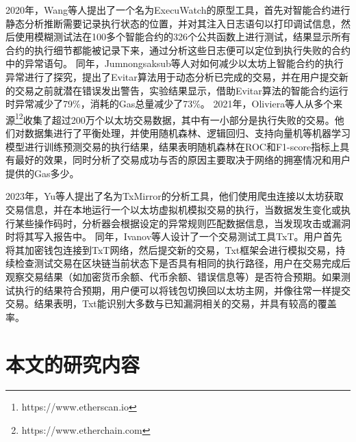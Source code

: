 2020年，Wang等人提出了一个名为ExecuWatch\cite{wang2020onthe}的原型工具，首先对智能合约进行静态分析推断需要记录执行状态的位置，并对其注入日志语句以打印调试信息，然后使用模糊测试法在100多个智能合约的326个公共函数上进行测试，结果显示所有合约的执行细节都能被记录下来，通过分析这些日志便可以定位到执行失败的合约中的异常语句。
同年，Jumnongsaksub等人对如何减少以太坊上智能合约的执行异常进行了探究，提出了Evitar算法用于动态分析已完成的交易，并在用户提交新的交易之前就潜在错误发出警告，实验结果显示，借助Evitar算法的智能合约运行时异常减少了79\%，消耗的Gas总量减少了73\%。
2021年，Oliviera等人从多个来源\footnote{https://www.etherscan.io}\footnote{https://www.etherchain.com}收集了超过200万个以太坊交易数据，其中有一小部分是执行失败的交易。他们对数据集进行了平衡处理，并使用随机森林、逻辑回归、支持向量机等机器学习模型进行训练预测交易的执行结果，结果表明随机森林在ROC和F1-score指标上具有最好的效果，同时分析了交易成功与否的原因主要取决于网络的拥塞情况和用户提供的Gas多少。

2023年，Yu等人提出了名为TxMirror的分析工具，他们使用爬虫连接以太坊获取交易信息，并在本地运行一个以太坊虚拟机模拟交易的执行，当数据发生变化或执行某些操作码时，分析器会根据设定的异常规则匹配数据信息，当发现攻击或漏洞时将其写入报告中。
同年，Ivanov等人设计了一个交易测试工具TxT\cite{IvanovTxT}。用户首先将其加密钱包连接到TxT网络，然后提交新的交易，Txt框架会进行模拟交易，持续检查测试交易在区块链当前状态下是否具有相同的执行路径，用户在交易完成后观察交易结果（如加密货币余额、代币余额、错误信息等）是否符合预期。如果测试执行的结果符合预期，用户便可以将钱包切换回以太坊主网，并像往常一样提交交易。结果表明，Txt能识别大多数与已知漏洞相关的交易，并具有较高的覆盖率。


\section{本文的研究内容}
\label{sec:本文的研究内容}

